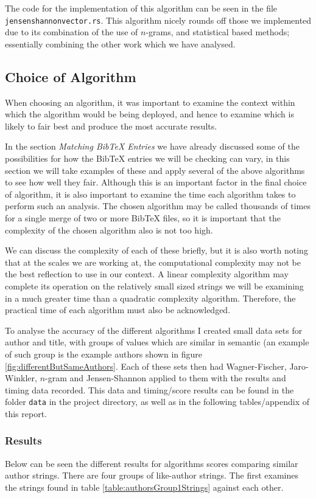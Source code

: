 \documentclass[a4paper,11pt]{article}
\newcommand{\code}[1]{\colorbox{codegray}{\texttt{#1}}}
\begin{document}
The code for the implementation of this algorithm can be seen in the file \code{jensen\textunderscore shannon\textunderscore vector.rs}. This algorithm nicely rounds off those we implemented due to its combination of the use of $n$-grams, and statistical based methods; essentially combining the other work which we have analysed.

\subsection{Choice of Algorithm}
When choosing an algorithm, it was important to examine the context within which the algorithm would be being deployed, and hence to examine which is likely to fair best and produce the most accurate results.

In the section \textit{Matching BibTeX Entries} we have already discussed some of the possibilities for how the BibTeX entries we will be checking can vary, in this section we will take examples of these and apply several of the above algorithms to see how well they fair. Although this is an important factor in the final choice of algorithm, it is also important to examine the time each algorithm takes to perform such an analysis. The chosen algorithm may be called thousands of times for a single merge of two or more BibTeX files, so it is important that the complexity of the chosen algorithm also is not too high.

We can discuss the complexity of each of these briefly, but it is also worth noting that at the scales we are working at, the computational complexity may not be the best reflection to use in our context. A linear complexity algorithm may complete its operation on the relatively small sized strings we will be examining in a much greater time than a quadratic complexity algorithm. Therefore, the practical time of each algorithm must also be acknowledged.

To analyse the accuracy of the different algorithms I created small data sets for author and title, with groups of values which are similar in semantic (an example of such group is the example authors shown in figure \ref{fig:differentButSameAuthors}. Each of these sets then had Wagner-Fischer, Jaro-Winkler, $n$-gram and Jensen-Shannon applied to them with the results and timing data recorded. This data and timing/score results can be found in the folder \code{data} in the project directory, as well as in the following tables/appendix of this report.

\subsubsection{Results}
Below can be seen the different results for algorithms scores comparing similar author strings. There are four groups of like-author strings.
The first examines the strings found in table \ref{table:authorsGroup1Strings} against each other.
\end{document}
